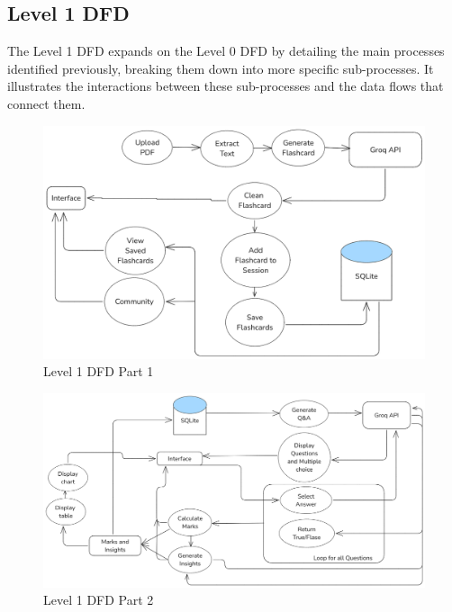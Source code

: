 \documentclass{report}
\begin{document}
\subsection{Level 1 DFD}
\Large
The Level 1 DFD expands on the Level 0 DFD by detailing the main processes identified previously, breaking them down into more specific sub-processes. It illustrates the interactions between these sub-processes and the data flows that connect them. \\
\begin{figure}[h]
    \centering
    \includegraphics[width=\textwidth]{DFD level 1 part 1.png}
    \caption{Level 1 DFD Part 1}
\end{figure}
\begin{figure}[h]
    \centering
    \includegraphics[width=\textwidth]{DFD level 1 part 2.png}
    \caption{Level 1 DFD Part 2}
\end{figure}
\clearpage

\vspace{-\baselineskip} %

\end{document}
